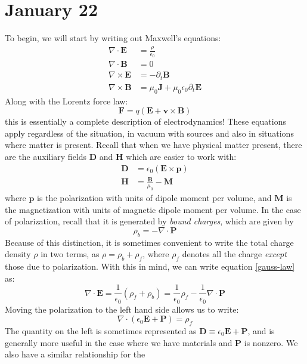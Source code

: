 \pagebreak
\section{January 22}
To begin, we will start by writing out Maxwell's equations:
\begin{align}
	\label{gauss-law}\nabla \cdot \mathbf{E} &= \frac{\rho}{\epsilon_0}\\
	\nabla \cdot \mathbf{B} &= 0 \\ 
	\label{faraday-law}\nabla \times \mathbf{E} &= -\partial_t \mathbf{B} \\ 
	\label{ampere-maxwell}\nabla \times \mathbf{B} &= \mu_0 \mathbf{J} + \mu_0 \epsilon_0 \partial_t \mathbf{E}
\end{align}
Along with the Lorentz force law:
\[
	\mathbf{F} = q(\mathbf{E} + \mathbf{v} \times \mathbf{B})
\]
this is essentially a complete description of electrodynamics! These equations apply regardless of the
situation, in vacuum with sources and also in situations where matter is present. Recall that when we have
physical matter present, there are the auxiliary fields \( \mathbf{D} \) and \( \mathbf{H} \) which are
easier to work with:
\begin{align*}
	\mathbf{D} &=  \epsilon_0 (\mathbf{E} \times \mathbf{p}) \\ 
	\mathbf{H} &= \frac{\mathbf{B}}{\mu_0} - \mathbf{M}
\end{align*}
where \( \mathbf{p} \) is the polarization with units of dipole moment per volume, and \( \mathbf{M} \) 
is the magnetization with units of magnetic dipole moment per volume. In the case of polarization, recall
that it is generated by \textit{bound charges}, which are given by
\[
	\rho_b = -\nabla \cdot \mathbf{P}
\]
Because of this distinction, it is sometimes convenient to write the total charge density \( \rho \) in two
terms, as \( \rho = \rho_b + \rho_f \), where \( \rho_f \) denotes all the charge \textit{except} those due
to polarization. With this in mind, we can write equation \ref{gauss-law} as: 
\[
	\nabla \cdot \mathbf{E} = \frac{1}{\epsilon_0}(\rho_f + \rho_b) = \frac{1}{\epsilon_0}\rho_f -
	\frac{1}{\epsilon_0} \nabla \cdot \mathbf{P}
\]
Moving the polarization to the left hand side allows us to write:
\[
	\nabla \cdot (\epsilon_0 \mathbf{E} + \mathbf{P}) = \rho_f
\]
The quantity on the left is sometimes represented as \( \mathbf{D} \equiv \epsilon_0 \mathbf{E} + \mathbf{P} \), 
and is generally more useful in the
case where we have materials and \( \mathbf{P} \) is nonzero. We also have a similar relationship for the
